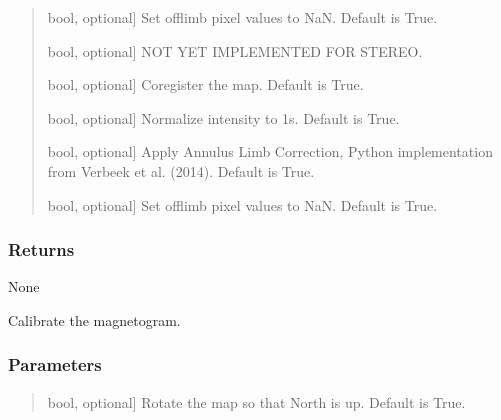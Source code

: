 \documentclass[letterpaper,10pt,english]{sphinxmanual}
\begin{document}
\begin{fulllineitems}
\begin{fulllineitems}
\begin{quote}
\begin{description}
\begin{description}
\sphinxlineitem{cut\_limb}{[}bool, optional{]}
\sphinxAtStartPar
Set off\sphinxhyphen{}limb pixel values to NaN. Default is True.

\end{description}

\begin{description}
\sphinxlineitem{deconvolve}{[}bool, optional{]}
\sphinxAtStartPar
NOT YET IMPLEMENTED FOR STEREO.

\sphinxlineitem{register}{[}bool, optional{]}
\sphinxAtStartPar
Co\sphinxhyphen{}register the map. Default is True.

\sphinxlineitem{normalize}{[}bool, optional{]}
\sphinxAtStartPar
Normalize intensity to 1s. Default is True.

\sphinxlineitem{alc}{[}bool, optional{]}
\sphinxAtStartPar
Apply Annulus Limb Correction, Python implementation from Verbeek et al. (2014). Default is True.

\sphinxlineitem{cut\_limb}{[}bool, optional{]}
\sphinxAtStartPar
Set off\sphinxhyphen{}limb pixel values to NaN. Default is True.

\end{description}

\end{description}
\end{quote}


\subsubsection{Returns}
\label{\detokenize{pycatch/pycatch:id8}}
\sphinxAtStartPar
None

\end{fulllineitems}


\begin{fulllineitems}
\label{\detokenize{pycatch/pycatch:pycatch.pycatch.pycatch.calibration_mag}}
\pysigstartsignatures
{}
\pysigstopsignatures
\sphinxAtStartPar
Calibrate the magnetogram.


\subsubsection{Parameters}
\label{\detokenize{pycatch/pycatch:id9}}\begin{quote}
\begin{description}
\begin{description}
\sphinxlineitem{rotate}{[}bool, optional{]}
\sphinxAtStartPar
Rotate the map so that North is up. Default is True.


\end{description}
\end{description}
\end{quote}
\end{fulllineitems}
\end{fulllineitems}
\end{document}
